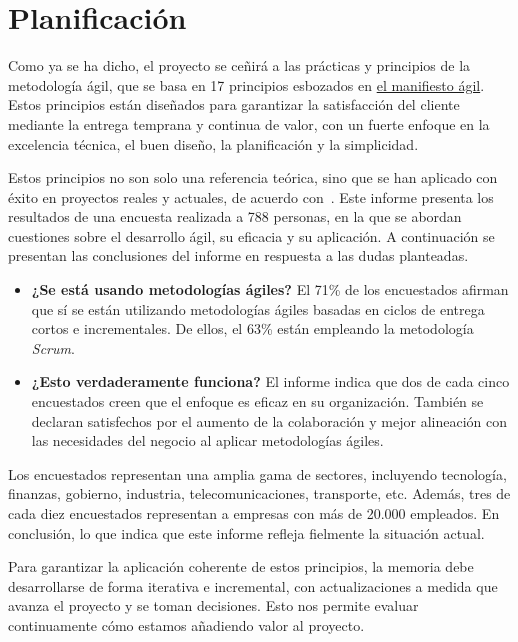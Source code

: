 \chapter{Planificación}

Como ya se ha dicho, el proyecto se ceñirá a las prácticas y principios de la metodología ágil, que se basa en 17 principios esbozados en \href{https://agilemanifesto.org/iso/es/manifesto.html}{el manifiesto ágil}. Estos principios están diseñados para garantizar la satisfacción del cliente mediante la entrega temprana y continua de valor, con un fuerte enfoque en la excelencia técnica, el buen diseño, la planificación y la simplicidad.

Estos principios no son solo una referencia teórica, sino que se han aplicado con éxito en proyectos reales y actuales, de acuerdo con~\cite{17thstateofagile}. Este informe presenta los resultados de una encuesta realizada a 788 personas, en la que se abordan cuestiones sobre el desarrollo ágil, su eficacia y su aplicación. A continuación se presentan las conclusiones del informe en respuesta a las dudas planteadas.

\begin{itemize}
    \item \textbf{¿Se está usando metodologías ágiles?} El 71\% de los encuestados afirman que sí se están utilizando metodologías ágiles basadas en ciclos de entrega cortos e incrementales. De ellos, el 63\% están empleando la metodología \textit{Scrum}.
    \item \textbf{¿Esto verdaderamente funciona?} El informe indica que dos de cada cinco encuestados creen que el enfoque es eficaz en su organización. También se declaran satisfechos por el aumento de la colaboración y mejor alineación con las necesidades del negocio al aplicar metodologías ágiles.
\end{itemize}

Los encuestados representan una amplia gama de sectores, incluyendo tecnología, finanzas, gobierno, industria, telecomunicaciones, transporte, etc. Además, tres de cada diez encuestados representan a empresas con más de 20.000 empleados. En conclusión, lo que indica que este informe refleja fielmente la situación actual.

Para garantizar la aplicación coherente de estos principios, la memoria debe desarrollarse de forma iterativa e incremental, con actualizaciones a medida que avanza el proyecto y se toman decisiones. Esto nos permite evaluar continuamente cómo estamos añadiendo valor al proyecto.

